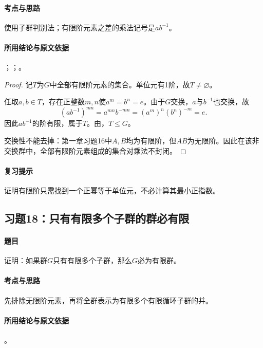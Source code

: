 \paragraph{考点与思路}
使用子群判别法；有限阶元素之差的乘法记号是$ab^{-1}$。

\paragraph{所用结论与原文依据}
；；。


\begin{proof}
记$T$为$G$中全部有限阶元素的集合。单位元有1阶，故$T\ne\varnothing$。

任取$a,b\in T$，存在正整数$m,n$使$a^m=b^n=e$。由于$G$交换，$a$与$b^{-1}$也交换，故
\[
(ab^{-1})^{mn}=a^{mn}b^{-mn}=(a^m)^n(b^n)^{-m}=e.
\]
因此$ab^{-1}$的阶有限，属于$T$。由，$T\leq G$。

交换性不能去掉：第一章习题16中$A,B$均为有限阶，但$AB$为无限阶。因此在该非交换群中，全部有限阶元素组成的集合对乘法不封闭。
\end{proof}

\paragraph{复习提示}
证明有限阶只需找到一个正幂等于单位元，不必计算其最小正指数。


\subsection{习题18：\texorpdfstring{只有有限多个子群的群必有限}{只有有限多个子群的群必有限}}
\label{ex:1:18}

\paragraph{题目}
证明：如果群$G$只有有限多个子群，那么$G$必为有限群。

\paragraph{考点与思路}
先排除无限阶元素，再将全群表示为有限多个有限循环子群的并。

\paragraph{所用结论与原文依据}
。


